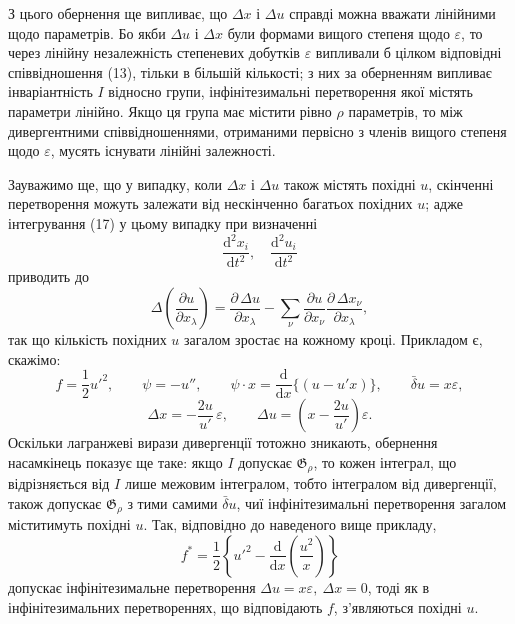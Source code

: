 \documentclass[11pt]{article}
\providecommand{\G}{\mathfrak G}
\providecommand{\eps}{\varepsilon}
\providecommand{\D}{\Delta}
\providecommand{\p}{\partial}
\providecommand{\dd}{\mathrm d}
\providecommand{\bd}{\bar{\delta}}
\begin{document}
З цього обернення ще випливає, що \(\D x\) і \(\D u\) справді можна вважати лінійними щодо параметрів. Бо якби \(\D u\) і \(\D x\) були формами вищого степеня щодо \(\eps\), то через лінійну незалежність степеневих добутків \(\eps\) випливали б цілком відповідні співвідношення (13), тільки в більшій кількості; з них за оберненням випливає інваріантність \(I\) відносно групи, інфінітезимальні перетворення якої містять параметри лінійно. Якщо ця група має містити рівно \(\rho\) параметрів, то між дивергентними співвідношеннями, отриманими первісно з членів вищого степеня щодо \(\eps\), мусять існувати лінійні залежності.

Зауважимо ще, що у випадку, коли \(\D x\) і \(\D u\) також містять похідні \(u\), скінченні перетворення можуть залежати від нескінченно багатьох похідних \(u\); адже інтегрування (17) у цьому випадку при визначенні
\[
\frac{\dd^2x_i}{\dd t^2},\quad \frac{\dd^2u_i}{\dd t^2}
\]
приводить до
\[
\D\!\left(\frac{\p u}{\p x_\lambda}\right)
=\frac{\p\,\D u}{\p x_\lambda}
-\sum_\nu\frac{\p u}{\p x_\nu}
\frac{\p\,\D x_\nu}{\p x_\lambda},
\]
так що кількість похідних \(u\) загалом зростає на кожному кроці. Прикладом є, скажімо:
\[
f=\frac12 u'^2,\qquad
\psi=-u'',\qquad
\psi\cdot x=\frac{\dd}{\dd x}\{(u-u'x)\},\qquad
\bd u=x\eps,
\]
\[
\D x=-\frac{2u}{u'}\,\eps,\qquad
\D u=\left(x-\frac{2u}{u'}\right)\eps.
\]
Оскільки лагранжеві вирази дивергенції тотожно зникають, обернення насамкінець показує ще таке: якщо \(I\) допускає \(\G_\rho\), то кожен інтеграл, що відрізняється від \(I\) лише межовим інтегралом, тобто інтегралом від дивергенції, також допускає \(\G_\rho\) з тими самими \(\bd u\), чиї інфінітезимальні перетворення загалом міститимуть похідні \(u\). Так, відповідно до наведеного вище прикладу,
\[
f^*=\frac12\left\{u'^2-\frac{\dd}{\dd x}\left(\frac{u^2}{x}\right)\right\}
\]
допускає інфінітезимальне перетворення \(\D u=x\eps,\ \D x=0\), тоді як в інфінітезимальних перетвореннях, що відповідають \(f\), з'являються похідні \(u\).
\end{document}
